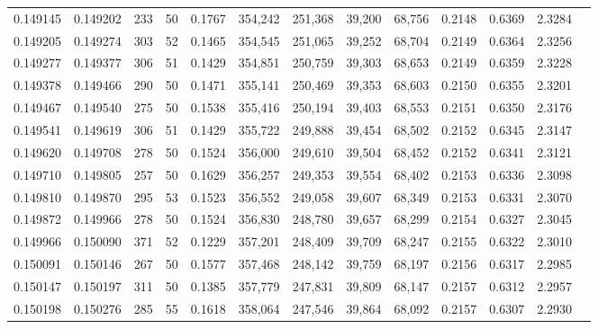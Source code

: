 \begin{tabular}{rrrrrrrrrrrrr}
0.149145 & 0.149202 &   233 &  50 &                                     0.1767 & 354,242 & 251,368 &  39,200 &  68,756 & 0.2148 & 0.6369 & 2.3284 \\
0.149205 & 0.149274 &   303 &  52 &                                     0.1465 & 354,545 & 251,065 &  39,252 &  68,704 & 0.2149 & 0.6364 & 2.3256 \\
0.149277 & 0.149377 &   306 &  51 &                                     0.1429 & 354,851 & 250,759 &  39,303 &  68,653 & 0.2149 & 0.6359 & 2.3228 \\
0.149378 & 0.149466 &   290 &  50 &                                     0.1471 & 355,141 & 250,469 &  39,353 &  68,603 & 0.2150 & 0.6355 & 2.3201 \\
0.149467 & 0.149540 &   275 &  50 &                                     0.1538 & 355,416 & 250,194 &  39,403 &  68,553 & 0.2151 & 0.6350 & 2.3176 \\
0.149541 & 0.149619 &   306 &  51 &                                     0.1429 & 355,722 & 249,888 &  39,454 &  68,502 & 0.2152 & 0.6345 & 2.3147 \\
0.149620 & 0.149708 &   278 &  50 &                                     0.1524 & 356,000 & 249,610 &  39,504 &  68,452 & 0.2152 & 0.6341 & 2.3121 \\
0.149710 & 0.149805 &   257 &  50 &                                     0.1629 & 356,257 & 249,353 &  39,554 &  68,402 & 0.2153 & 0.6336 & 2.3098 \\
0.149810 & 0.149870 &   295 &  53 &                                     0.1523 & 356,552 & 249,058 &  39,607 &  68,349 & 0.2153 & 0.6331 & 2.3070 \\
0.149872 & 0.149966 &   278 &  50 &                                     0.1524 & 356,830 & 248,780 &  39,657 &  68,299 & 0.2154 & 0.6327 & 2.3045 \\
0.149966 & 0.150090 &   371 &  52 &                                     0.1229 & 357,201 & 248,409 &  39,709 &  68,247 & 0.2155 & 0.6322 & 2.3010 \\
0.150091 & 0.150146 &   267 &  50 &                                     0.1577 & 357,468 & 248,142 &  39,759 &  68,197 & 0.2156 & 0.6317 & 2.2985 \\
0.150147 & 0.150197 &   311 &  50 &                                     0.1385 & 357,779 & 247,831 &  39,809 &  68,147 & 0.2157 & 0.6312 & 2.2957 \\
0.150198 & 0.150276 &   285 &  55 &                                     0.1618 & 358,064 & 247,546 &  39,864 &  68,092 & 0.2157 & 0.6307 & 2.2930 \\

\end{tabular}
